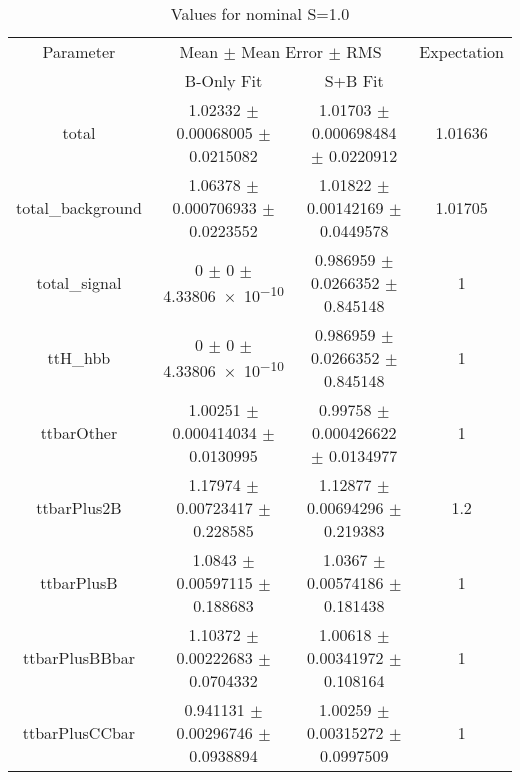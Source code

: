\begin{table}
\centering
\caption{Values for nominal S=1.0}
\begin{tabular}{cccc}
\toprule
Parameter & \multicolumn{2}{c}{Mean $\pm$ Mean Error $\pm$ RMS} & Expectation\\
 & B-Only Fit & S+B Fit & \\
\midrule
total & \num{1.02332} $\pm$ \num{0.00068005} $\pm$ \num{0.0215082} & \num{1.01703} $\pm$ \num{0.000698484} $\pm$ \num{0.0220912} & \num{1.01636}\\
total\_background & \num{1.06378} $\pm$ \num{0.000706933} $\pm$ \num{0.0223552} & \num{1.01822} $\pm$ \num{0.00142169} $\pm$ \num{0.0449578} & \num{1.01705}\\
total\_signal & \num{0} $\pm$ \num{0} $\pm$ \num{4.33806e-10} & \num{0.986959} $\pm$ \num{0.0266352} $\pm$ \num{0.845148} & \num{1}\\
ttH\_hbb & \num{0} $\pm$ \num{0} $\pm$ \num{4.33806e-10} & \num{0.986959} $\pm$ \num{0.0266352} $\pm$ \num{0.845148} & \num{1}\\
ttbarOther & \num{1.00251} $\pm$ \num{0.000414034} $\pm$ \num{0.0130995} & \num{0.99758} $\pm$ \num{0.000426622} $\pm$ \num{0.0134977} & \num{1}\\
ttbarPlus2B & \num{1.17974} $\pm$ \num{0.00723417} $\pm$ \num{0.228585} & \num{1.12877} $\pm$ \num{0.00694296} $\pm$ \num{0.219383} & \num{1.2}\\
ttbarPlusB & \num{1.0843} $\pm$ \num{0.00597115} $\pm$ \num{0.188683} & \num{1.0367} $\pm$ \num{0.00574186} $\pm$ \num{0.181438} & \num{1}\\
ttbarPlusBBbar & \num{1.10372} $\pm$ \num{0.00222683} $\pm$ \num{0.0704332} & \num{1.00618} $\pm$ \num{0.00341972} $\pm$ \num{0.108164} & \num{1}\\
ttbarPlusCCbar & \num{0.941131} $\pm$ \num{0.00296746} $\pm$ \num{0.0938894} & \num{1.00259} $\pm$ \num{0.00315272} $\pm$ \num{0.0997509} & \num{1}\\
\bottomrule
\end{tabular}
\end{table}